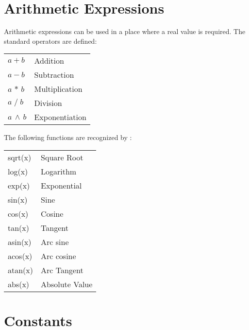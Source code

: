 \section{Arithmetic Expressions}

Arithmetic expressions can be used in a place where a real value is required.
The standard operators are defined: \hfil\break
\hspace*{0.15in}
\begin{tabular}{ll}
  $a + b$           & Addition        \\
  $a - b$           & Subtraction     \\
  $a \, \ast \, b$  & Multiplication  \\
  $a \; / \; b$     & Division        \\
  $a \, \land \, b$ & Exponentiation  \\
\end{tabular}

The following functions are recognized by \bmad: \hfil\break
\hspace*{0.15in}
\begin{tabular}{ll}
  sqrt(x) &  Square Root    \\
  log(x)  &  Logarithm      \\
  exp(x)  &  Exponential    \\
  sin(x)  &  Sine           \\
  cos(x)  &  Cosine         \\
  tan(x)  &  Tangent        \\
  asin(x) &  Arc sine       \\
  acos(x) &  Arc cosine     \\
  atan(x) &  Arc Tangent    \\
  abs(x)  &  Absolute Value \\
\end{tabular}


\section{Constants}

